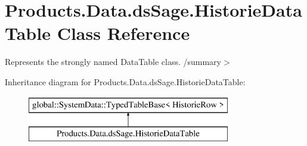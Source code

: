 \hypertarget{class_products_1_1_data_1_1ds_sage_1_1_historie_data_table}{}\section{Products.\+Data.\+ds\+Sage.\+Historie\+Data\+Table Class Reference}
\label{class_products_1_1_data_1_1ds_sage_1_1_historie_data_table}


Represents the strongly named Data\+Table class. /summary$>$  


Inheritance diagram for Products.\+Data.\+ds\+Sage.\+Historie\+Data\+Table\+:\begin{figure}[H]
\begin{center}
\leavevmode
\includegraphics[height=2.000000cm]{class_products_1_1_data_1_1ds_sage_1_1_historie_data_table}
\end{center}
\end{figure}
